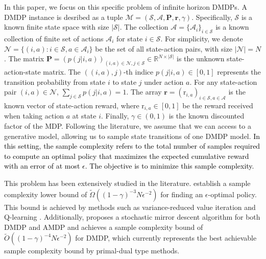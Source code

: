 \documentclass[12pt]{article}
\begin{document}
In this paper, we focus on this specific problem of infinite horizon DMDPs. A DMDP instance is desribed as a tuple $\mathcal{M} = (\mathcal{S},\mathcal{A},\boldsymbol{\text{P}},\boldsymbol{\text{r}},\gamma)$. Specifically, $\mathcal{S}$ is a known finite state space with size $|\mathcal{S}|$. The collection $\mathcal{A} = \{ \mathcal{A}_i\}_{i \in \mathcal{S}}$ is a known collection of finite set of actions $\mathcal{A}_i$ for state $i \in \mathcal{S}$. For simplicity, we denote $\mathcal{N} = \{(i,a):i \in \mathcal{S},a \in \mathcal{A}_i\}$ be the set of all state-action pairs, with size $|\mathcal{N}|=N$. The matrix $\boldsymbol{\text{P}} = (p(j|i,a))_{(i,a) \in \mathcal{N},j \in \mathcal{S}}  \in \mathbb{R}^{N  \times|\mathcal{S}|}$ is the unknown state-action-state matrix.
The $((i,a),j)$-th indice $p(j|i,a) \in [0,1]$ represents the transition probability from state $i$ to state $j$ under action $a$. 
For any state-action pair $(i,a) \in \mathcal{N}$, $\sum_{j \in \mathcal{S}} p(j|i,a) = 1$.
The array $\boldsymbol{\text{r}} = (\text{r}_{i,a})_{i \in \mathcal{S},a \in \mathcal{A}}$ is the known vector of state-action reward, where $\text{r}_{i,a} \in [0,1]$ be the reward received when taking action $a$ at state $i$. 
Finally, $\gamma \in (0,1)$ is the known discounted factor of the MDP. 
Following the literature, we assume that we can access to a generative model, allowing us to sample state transitions of one DMDP model. 
\textcolor{black}{In this setting, the sample complexity refers to the total number of samples required to compute an optimal policy that maximizes the expected cumulative reward with an error of at most $\epsilon$. The objective is to minimize this sample complexity.}




This problem has been extensively studied in the literature. \cite{gheshlaghi2013minimax} establish a sample complexity lower bound of $\tilde{\Omega}((1-\gamma)^{-3} N \epsilon^{-2})$ for finding an $\epsilon$-optimal policy. This bound is achieved by methods such as variance-reduced value iteration \cite{sidford2018near} and Q-learning \cite{wainwright2019variance}. Additionally, \cite{jin2020efficiently} proposes a stochastic mirror descent algorithm for both DMDP and AMDP and achieves a sample complexity bound of $\tilde{O}((1-\gamma)^{-4} N \epsilon^{-2})$ for DMDP, which currently represents the best achievable sample complexity bound by primal-dual type methods. 
\end{document}
